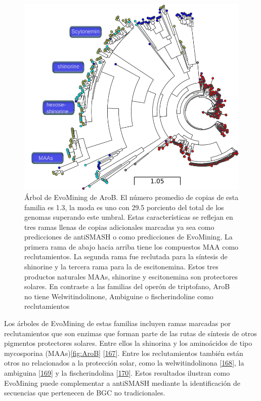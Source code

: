 \documentclass[12pt,twoside]{reedthesis}
\begin{document}
  \begin{figure}[h!tbp]
  \centering
  \includegraphics[angle = 0,scale = .9]{chapter2/AroB.pdf}
  \caption[AroB en Cianobacteria]{\footnotesize{Árbol de EvoMining de AroB. El número promedio de copias de esta familia es 1.3, la moda es uno con 29.5 porciento del total de los genomas superando este umbral. Estas características se reflejan en tres ramas llenas de copias adicionales marcadas ya sea como predicciones de antiSMASH o como predicciones de EvoMining. La primera rama de abajo hacia arriba tiene los compuestos MAA como reclutamientos. La segunda rama fue reclutada para la síntesis de shinorine y la tercera rama para la de escitonemina. Estos tres productos naturales MAAs, shinorine y escitonemina son protectores solares. En contraste a las familias del operón de triptofano, AroB no tiene Welwitindolinone, Ambiguine o fischerindoline como reclutamientos}}
  \label{fig:AroB}
  \end{figure}
  
  Los árboles de EvoMining de estas familias incluyen ramas marcadas por
  reclutamientos que son enzimas que forman parte de las rutas de síntesis
  de otros pigmentos protectores solares. Entre ellos la shinorina y los
  aminoácidos de tipo mycosporina (MAAs)\autoref{fig:AroB}
  {[}\protect\hyperlink{ref-balskus_genetic_2010}{167}{]}. Entre los
  reclutamientos también están otros no relacionados a la protección
  solar, como la welwitindolinona
  {[}\protect\hyperlink{ref-hillwig_identification_2014}{168}{]}, la
  ambiguina
  {[}\protect\hyperlink{ref-li_hapalindole_ambiguine_2015}{169}{]} y la
  fischerindolina {[}\protect\hyperlink{ref-li_decoding_2017}{170}{]}.
  Estos resultados ilustran como EvoMining puede complementar a antiSMASH
  mediante la identificación de secuencias que pertenecen de BGC no
  tradicionales.
  
\end{document}
